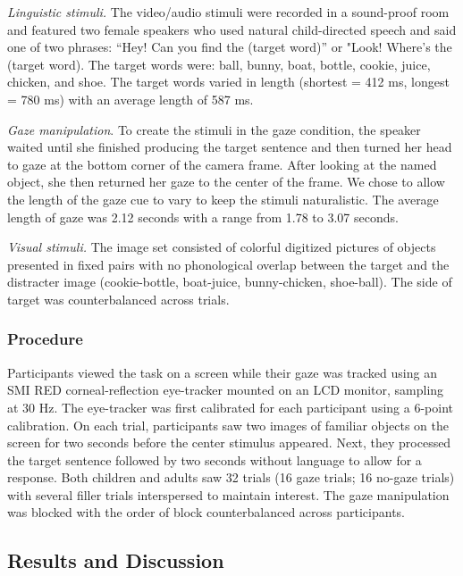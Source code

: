 \documentclass[10pt, letterpaper]{article}
\begin{document}
\emph{Linguistic stimuli.} The video/audio stimuli were recorded in a
sound-proof room and featured two female speakers who used natural
child-directed speech and said one of two phrases: ``Hey! Can you find
the (target word)'' or "Look! Where's the (target word). The target
words were: ball, bunny, boat, bottle, cookie, juice, chicken, and shoe.
The target words varied in length (shortest = 412 ms, longest = 780 ms)
with an average length of 587 ms.

\emph{Gaze manipulation}. To create the stimuli in the gaze condition,
the speaker waited until she finished producing the target sentence and
then turned her head to gaze at the bottom corner of the camera frame.
After looking at the named object, she then returned her gaze to the
center of the frame. We chose to allow the length of the gaze cue to
vary to keep the stimuli naturalistic. The average length of gaze was
2.12 seconds with a range from 1.78 to 3.07 seconds.

\emph{Visual stimuli.} The image set consisted of colorful digitized
pictures of objects presented in fixed pairs with no phonological
overlap between the target and the distracter image (cookie-bottle,
boat-juice, bunny-chicken, shoe-ball). The side of target was
counterbalanced across trials.

\hypertarget{procedure}{%
\subsubsection{Procedure}\label{procedure}}

Participants viewed the task on a screen while their gaze was tracked
using an SMI RED corneal-reflection eye-tracker mounted on an LCD
monitor, sampling at 30 Hz. The eye-tracker was first calibrated for
each participant using a 6-point calibration. On each trial,
participants saw two images of familiar objects on the screen for two
seconds before the center stimulus appeared. Next, they processed the
target sentence followed by two seconds without language to allow for a
response. Both children and adults saw 32 trials (16 gaze trials; 16
no-gaze trials) with several filler trials interspersed to maintain
interest. The gaze manipulation was blocked with the order of block
counterbalanced across participants.

\hypertarget{results-and-discussion}{%
\subsection{Results and Discussion}\label{results-and-discussion}}
\end{document}
